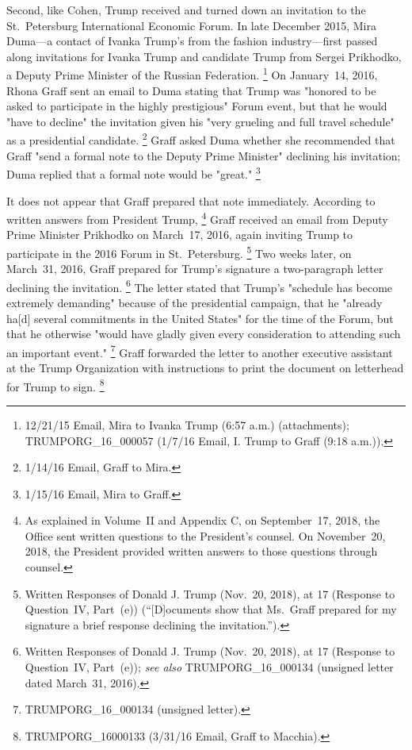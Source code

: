 Second, like Cohen, Trump received and turned down an invitation to the St.~Petersburg International Economic Forum.
In late December 2015, Mira Duma---a contact of Ivanka Trump's from the fashion industry---first passed along invitations for Ivanka Trump and candidate Trump from Sergei Prikhodko, a Deputy Prime Minister of the Russian Federation.%
\footnote{12/21/15 Email, Mira to Ivanka Trump (6:57 a.m.) (attachments);
TRUMPORG\_16\_000057 (1/7/16 Email, I. Trump to Graff (9:18 a.m.)).}
On January~14, 2016, Rhona Graff sent an email to Duma stating that Trump was "honored to be asked to participate in the highly prestigious" Forum event, but that he would "have to decline" the invitation given his "very grueling and full travel schedule" as a presidential candidate.%
\footnote{1/14/16 Email, Graff to Mira.}
Graff asked Duma whether she recommended that Graff "send a formal note to the Deputy Prime Minister" declining his invitation; Duma replied that a formal note would be "great."%
\footnote{1/15/16 Email, Mira to Graff.}

It does not appear that Graff prepared that note immediately.
According to written answers from President Trump,%
\footnote{As explained in Volume~II and Appendix C, on September~17, 2018, the Office sent written questions to the President's counsel.
On November~20, 2018, the President provided written answers to those questions through counsel.}
Graff received an email from Deputy Prime Minister Prikhodko on March~17, 2016, again inviting Trump to participate in the 2016 Forum in St.~Petersburg.%
\footnote{Written Responses of Donald J. Trump (Nov.~20, 2018), at 17 (Response to Question~IV, Part~(e)) (“[D]ocuments show that Ms.~Graff prepared for my signature a brief response declining the invitation.”).}
Two weeks later, on March~31, 2016, Graff prepared for Trump's signature a two-paragraph letter declining the invitation.%
\footnote{Written Responses of Donald J. Trump (Nov.~20, 2018), at 17 (Response to Question~IV, Part~(e));
\textit{see also} TRUMPORG\_16\_000134 (unsigned letter dated March~31, 2016).}
The letter stated that Trump's "schedule has become extremely demanding" because of the presidential campaign, that he "already ha[d] several commitments in the United States" for the time of the Forum, but that he otherwise "would have gladly given every consideration to attending such an important event."%
\footnote{TRUMPORG\_16\_000134 (unsigned letter).}
Graff forwarded the letter to another executive assistant at the Trump Organization with instructions to print the document on letterhead for Trump to sign.%
\footnote{TRUMPORG\_16000133 (3/31/16 Email, Graff to Macchia).}

